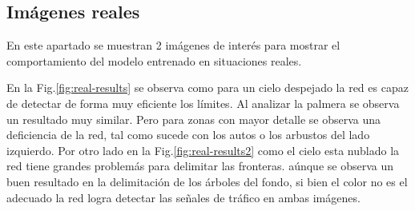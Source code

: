 \documentclass[]{IEEEtran}
\begin{document}
    \subsection{Imágenes reales}

    En este apartado se muestran 2 imágenes de interés para mostrar el comportamiento del modelo entrenado en situaciones reales.

    En la Fig.\ref{fig:real-results} se observa como para un cielo despejado la red es capaz de detectar de forma muy eficiente los límites. 
    Al analizar la palmera se observa un resultado muy similar. Pero para zonas con mayor detalle se observa una deficiencia de la red, tal 
    como sucede con los autos o los arbustos del lado izquierdo. Por otro lado en la Fig.\ref{fig:real-results2} como el cielo esta nublado 
    la red tiene grandes problemás para delimitar las fronteras. aúnque se observa un buen resultado en la delimitación de los árboles del fondo, 
    si bien el color no es el adecuado la red logra detectar las señales de tráfico en ambas imágenes.
\end{document}
